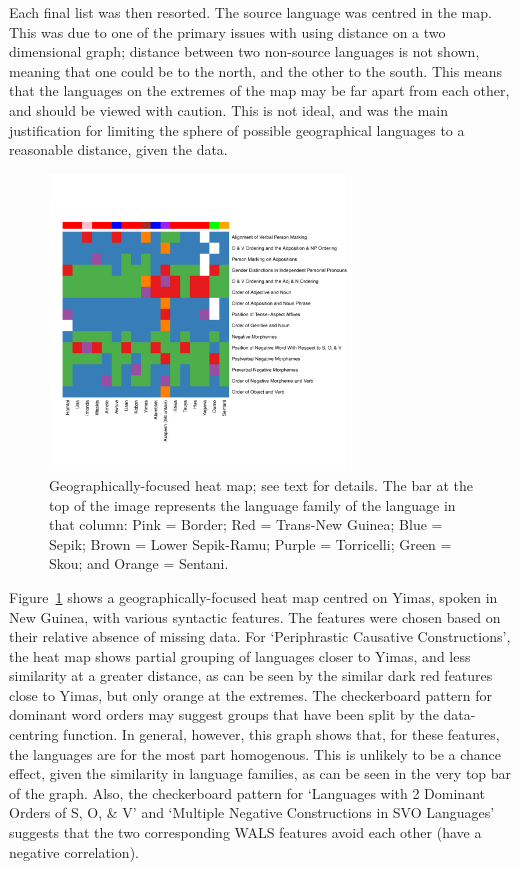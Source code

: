 \documentclass[11pt]{article}
\begin{document}
Each final list was then resorted. The source language was centred in the map. This was due to one of the primary issues with using distance on a two dimensional graph; distance between two non-source languages is not shown, meaning that one could be to the north, and the other to the south. This means that the languages on the extremes of the map may be far apart from each other, and should be viewed with caution. %
 This is not ideal, and was the main justification for limiting the sphere of possible geographical languages to a reasonable distance, given the data.


\begin{figure}[!b]
\includegraphics[width=3.1in]
{graph2yim.pdf} 
\caption{Geographically-focused heat map; see text for details. The bar at the top of the image represents the language family of the language in that column: Pink = Border; Red = Trans-New Guinea; Blue = Sepik; Brown = Lower Sepik-Ramu; Purple = Torricelli; Green = Skou; and Orange = Sentani.} 
\label{fig:heat1} 

\end{figure}

Figure~\ref{fig:heat1} shows a geographically-focused heat map centred on Yimas, spoken in New Guinea, with various syntactic features. The features were chosen based on their relative absence of missing data. For `Periphrastic Causative Constructions', the heat map shows partial grouping of languages closer to Yimas, and less similarity at a greater distance, as can be seen by the similar dark red features close to Yimas, but only orange at the extremes. The checkerboard pattern for dominant word orders may suggest groups that have been split by the data-centring function. In general, however, this graph shows that, for these features, the languages are for the most part homogenous. This is unlikely to be a chance effect, given the similarity in language families, as can be seen in the very top bar of the graph. Also, the checkerboard pattern for `Languages with 2 Dominant Orders of S, O, \& V' and `Multiple Negative Constructions in SVO Languages' suggests that the two corresponding WALS features avoid each other (have a negative correlation). 
\end{document}
